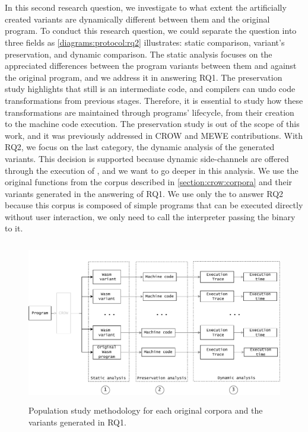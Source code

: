 
\section{\rqtwo}
\label{rq2:method}


In this second research question, we investigate to what extent the artificially created variants are dynamically different between them and the original program. To conduct this research question, we could separate the question into three fields as \autoref{diagrams:protocol:rq2} illustrates: static comparison, variant's preservation, and dynamic comparison. 
The static analysis focuses on the appreciated differences between the program variants between them and against the original program, and we address it in answering RQ1. The preservation study highlights that \wasm still is an intermediate code, and compilers can undo code transformations from previous stages. Therefore, it is essential to study how these transformations are maintained through \wasm programs' lifecycle, from their creation to the machine code execution. The preservation study is out of the scope of this work, and it was previously addressed in CROW and MEWE contributions.
With RQ2, we focus on the last category, the dynamic analysis of the generated variants. This decision is supported because dynamic side-channels are offered through the execution of \wasm \citationneeded, and we want to go deeper in this analysis.
We use the original functions from the \corpusrosetta corpus described in \autoref{section:crow:corpora} and their variants generated in the answering of RQ1. 
We use only the \corpusrosetta to answer RQ2 because this corpus is composed of simple programs that can be executed directly without user interaction, \ie we only need to call the interpreter passing the \wasm binary to it. 


\begin{figure}[h]
    \centering
    \includegraphics[height=2.8in]{diagrams/Rq2.pdf}
    \caption{Population study methodology for each original corpora and the variants generated in RQ1.}
    \label{diagrams:protocol:rq2}
\end{figure}

